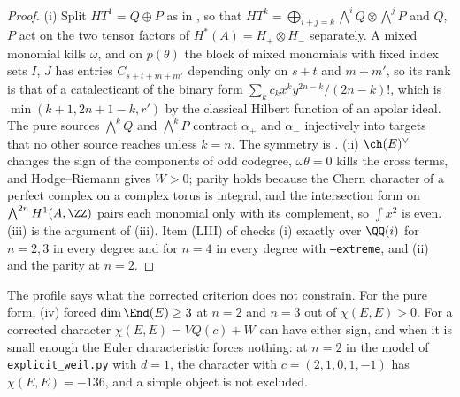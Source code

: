\begin{proof}
(i) Split $HT^{1}=Q\oplus P$ as in , so that
$HT^{k}=\bigoplus_{i+j=k}\bigwedge^{i}Q\otimes\bigwedge^{j}P$ and $Q$, $P$ act
on the two tensor factors of $H^{*}(A)=H_{+}\otimes H_{-}$ separately. A mixed
monomial kills $\omega$, and on $p(\theta)$ the block of mixed monomials with
fixed index sets $I$, $J$ has entries $C_{s+t+m+m'}$ depending only on
$s+t$ and $m+m'$, so its rank is that of a catalecticant of the binary form
$\sum_{k}c_{k}x^{k}y^{2n-k}/(2n-k)!$, which is $\min(k+1,2n+1-k,r')$ by the
classical Hilbert function of an apolar ideal. The pure sources
$\bigwedge^{k}Q$ and $\bigwedge^{k}P$ contract $\alpha_{+}$ and $\alpha_{-}$
injectively into targets that no other source reaches unless $k=n$. The
symmetry is . (ii) $\ch(E)^{\vee}$ changes the sign of
the components of odd codegree, $\omega\theta=0$ kills the cross terms, and
Hodge--Riemann gives $W>0$; parity holds because the Chern character of a
perfect complex on a complex torus is integral, and the intersection form on
$\bigwedge^{2n}H^{1}(A,\ZZ)$ pairs each monomial only with its complement, so
$\int x^{2}$ is even. (iii) is the argument of (iii).
Item (LIII) of  checks (i) exactly over $\QQ(i)$ for
$n=2,3$ in every degree and for $n=4$ in every degree with \texttt{--extreme},
and (ii) and the parity at $n=2$.
\end{proof}

The profile says what the corrected criterion does not constrain. For the pure
form, (iv) forced $\dim\End(E)\ge3$ at $n=2$ and $n=3$ out of
$\chi(E,E)>0$. For a corrected character $\chi(E,E)=VQ(c)+W$ can have either
sign, and when it is small enough the Euler characteristic forces nothing: at
$n=2$ in the model of \texttt{explicit\_weil.py} with $d=1$, the character with
$c=(2,1,0,1,-1)$ has $\chi(E,E)=-136$, and a simple object is not excluded.

